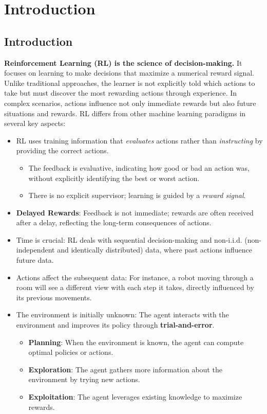 \chapter{Introduction}
\section{Introduction}

\textbf{Reinforcement Learning (RL) is the science of decision-making.} It focuses on learning to make decisions that maximize a numerical reward signal. Unlike traditional approaches, the learner is not explicitly told which actions to take but must discover the most rewarding actions through experience. In complex scenarios, actions influence not only immediate rewards but also future situations and rewards. RL differs from other machine learning paradigms in several key aspects:
\begin{itemize}
    \item RL uses training information that \textit{evaluates} actions rather than \textit{instructing} by providing the correct actions.
    \begin{itemize}
        \item The feedback is evaluative, indicating how good or bad an action was, without explicitly identifying the best or worst action.
        \item There is no explicit supervisor; learning is guided by a \textit{reward signal}.
    \end{itemize}
    \item \textbf{Delayed Rewards}: Feedback is not immediate; rewards are often received after a delay, reflecting the long-term consequences of actions.
    \item Time is crucial: RL deals with sequential decision-making and non-i.i.d. (non-independent and identically distributed) data, where past actions influence future data.
    \item Actions affect the subsequent data: For instance, a robot moving through a room will see a different view with each step it takes, directly influenced by its previous movements.
    \item The environment is initially unknown: The agent interacts with the environment and improves its policy through \textbf{trial-and-error}.
    \begin{itemize}
        \item \textbf{Planning}: When the environment is known, the agent can compute optimal policies or actions.
        \item \textbf{Exploration}: The agent gathers more information about the environment by trying new actions.
        \item \textbf{Exploitation}: The agent leverages existing knowledge to maximize rewards.
    \end{itemize}
\end{itemize}

